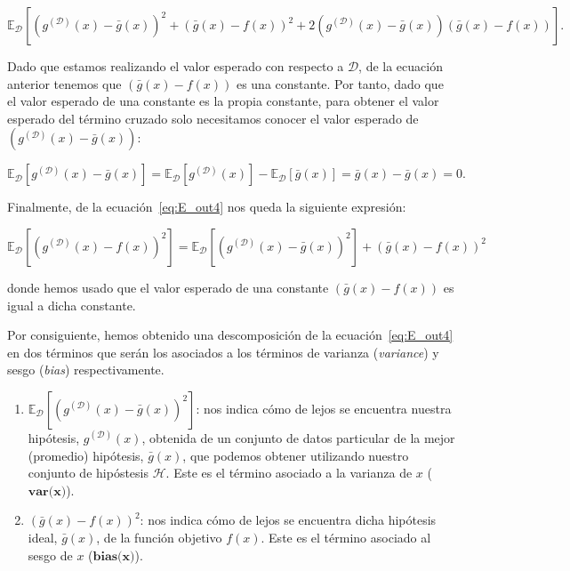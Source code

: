 \[ \mathbb{E}_{\mathcal{D}}[{(g^{\mathcal{(D)}}(x) - \bar{g}(x))}^2 + {(\bar{g}(x) - f(x))}^2 + 2(g^{\mathcal{(D)}}(x) - \bar{g}(x))(\bar{g}(x) - f(x))]. \]\newline

Dado que estamos realizando el valor esperado con respecto a $\mathcal{D}$, de la ecuación anterior tenemos que $(\bar{g}(x) - f(x))$ es una constante. Por tanto, dado que el valor esperado de una constante es la propia constante, para obtener el valor esperado del término cruzado solo necesitamos conocer el valor esperado de $(g^{\mathcal{(D)}}(x) - \bar{g}(x))$:

\begin{equation}\label{eq:E_out6}
    \mathbb{E}_{\mathcal{D}}[g^{\mathcal{(D)}}(x) - \bar{g}(x)] = \mathbb{E}_{\mathcal{D}}[g^{\mathcal{(D)}}(x)] - \mathbb{E}_{\mathcal{D}}[\bar{g}(x)] = \bar{g}(x) - \bar{g}(x) = 0.
\end{equation}\newline

Finalmente, de la ecuación~\eqref{eq:E_out4} nos queda la siguiente expresión:

\begin{equation}\label{eq:E_out7}
    \mathbb{E}_{\mathcal{D}}[{(g^{\mathcal{(D)}}(x) - f(x))}^2] = \mathbb{E}_{\mathcal{D}}[{(g^{\mathcal{(D)}}(x) - \bar{g}(x))}^2] + {(\bar{g}(x) - f(x))}^2
\end{equation}

donde hemos usado que el valor esperado de una constante $(\bar{g}(x) - f(x))$ es igual a dicha constante.\newline

Por consiguiente, hemos obtenido una descomposición de la ecuación~\eqref{eq:E_out4} en dos términos que serán los asociados a los términos de varianza (\textit{variance}) y sesgo (\textit{bias}) respectivamente.

\begin{enumerate}
    \item $\mathbb{E}_{\mathcal{D}}[{(g^{\mathcal{(D)}}(x) - \bar{g}(x))}^2]$: nos indica cómo de lejos se encuentra nuestra hipótesis, $g^{\mathcal{(D)}}(x)$, obtenida de un conjunto de datos particular de la mejor (promedio) hipótesis, $\bar{g}(x)$, que podemos obtener utilizando nuestro conjunto de hipóstesis $\mathcal{H}$. Este es el término asociado a la varianza de $x$ ($\textbf{var(x)}$).
    \item ${(\bar{g}(x) - f(x))}^2$: nos indica cómo de lejos se encuentra dicha hipótesis ideal, $\bar{g}(x)$, de la función objetivo $f(x)$. Este es el término asociado al sesgo de $x$ ($\textbf{bias(x)}$).\newline
\end{enumerate}

